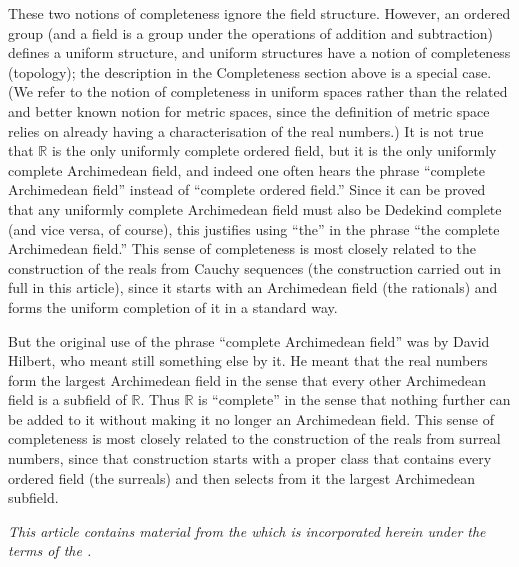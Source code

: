 \documentclass{article}
\begin{document}
These two notions of completeness ignore the field structure. However, an
ordered group (and a field is a group under the operations of addition and
subtraction) defines a uniform structure, and uniform structures have a notion
of completeness (topology); the description in the Completeness section above
is a special case. (We refer to the notion of completeness in uniform spaces
rather than the related and better known notion for metric spaces, since the
definition of metric space relies on already having a characterisation of the
real numbers.) It is not true that $\mathbb{R}$ is the only uniformly complete
ordered
field, but it is the only uniformly complete Archimedean field, and indeed one
often hears the phrase ``complete Archimedean field'' instead of ``complete
ordered field.'' Since it can be proved that any uniformly complete Archimedean
field must also be Dedekind complete (and vice versa, of course), this
justifies using ``the'' in the phrase ``the complete Archimedean field.'' This
sense of completeness is most closely related to the construction of the reals
from Cauchy sequences (the construction carried out in full in this article),
since it starts with an Archimedean field (the rationals) and forms the uniform
completion of it in a standard way.
                                                                                
But the original use of the phrase ``complete Archimedean field'' was by David
Hilbert, who meant still something else by it. He meant that the real numbers
form the largest Archimedean field in the sense that every other Archimedean
field is a subfield of $\mathbb{R}$. Thus $\mathbb{R}$ is ``complete'' in the
sense that nothing
further can be added to it without making it no longer an Archimedean field.
This sense of completeness is most closely related to the construction of the
reals from surreal numbers, since that construction starts with a proper class
that contains every ordered field (the surreals) and then selects from it the
largest Archimedean subfield.

\emph{This article contains material from the  which is incorporated herein under the terms of the .}
\end{document}
